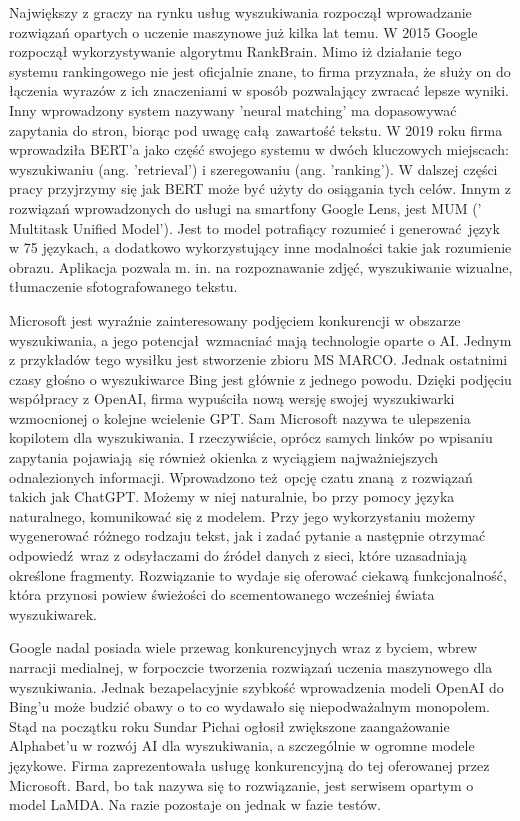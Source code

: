 Największy z graczy na rynku usług wyszukiwania rozpoczął wprowadzanie rozwiązań opartych o uczenie maszynowe już kilka lat temu. W 2015 Google rozpoczął wykorzystywanie algorytmu RankBrain. Mimo iż działanie tego systemu rankingowego nie jest oficjalnie znane, to firma przyznała, że służy on do łączenia wyrazów z ich znaczeniami w sposób pozwalający zwracać lepsze wyniki. Inny wprowadzony system nazywany 'neural matching' ma dopasowywać zapytania do stron, biorąc pod uwagę całą zawartość tekstu. W 2019 roku firma wprowadziła BERT'a jako część swojego systemu w dwóch kluczowych miejscach: wyszukiwaniu (ang. 'retrieval') i szeregowaniu (ang. 'ranking'). W dalszej części pracy przyjrzymy się jak BERT może być użyty do osiągania tych celów. Innym z rozwiązań wprowadzonych do usługi na smartfony Google Lens, jest MUM (' Multitask Unified Model'). Jest to model potrafiący rozumieć i generować język w 75 językach, a dodatkowo wykorzystujący inne modalności takie jak rozumienie obrazu. \autocite{howaipowers} Aplikacja pozwala m. in. na rozpoznawanie zdjęć, wyszukiwanie wizualne, tłumaczenie sfotografowanego tekstu.\newline

Microsoft jest wyraźnie zainteresowany podjęciem konkurencji w obszarze wyszukiwania, a jego potencjał wzmacniać mają technologie oparte o AI. Jednym z przykładów tego wysiłku jest stworzenie zbioru MS MARCO. Jednak ostatnimi czasy głośno o wyszukiwarce Bing jest głównie z jednego powodu. Dzięki podjęciu współpracy z OpenAI, firma wypuściła nową wersję swojej wyszukiwarki wzmocnionej o kolejne wcielenie GPT. Sam Microsoft nazywa te ulepszenia kopilotem dla wyszukiwania. I rzeczywiście, oprócz samych linków po wpisaniu zapytania pojawiają się również okienka z wyciągiem najważniejszych odnalezionych informacji. Wprowadzono też opcję czatu znaną z rozwiązań takich jak ChatGPT. Możemy w niej naturalnie, bo przy pomocy języka naturalnego, komunikować się z modelem. Przy jego wykorzystaniu możemy wygenerować różnego rodzaju tekst, jak i zadać pytanie a następnie otrzymać odpowiedź wraz z odsyłaczami do źródeł danych z sieci, które uzasadniają określone fragmenty. \autocite{reinventingsearch} Rozwiązanie to wydaje się oferować ciekawą funkcjonalność, która przynosi powiew świeżości do scementowanego wcześniej świata wyszukiwarek. \newline  

Google nadal posiada wiele przewag konkurencyjnych wraz z byciem, wbrew narracji medialnej, w forpoczcie tworzenia rozwiązań uczenia maszynowego dla wyszukiwania. Jednak bezapelacyjnie szybkość wprowadzenia modeli OpenAI do Bing'u może budzić obawy o to co wydawało się niepodważalnym monopolem. Stąd na początku roku Sundar Pichai ogłosił zwiększone zaangażowanie Alphabet'u w rozwój AI dla wyszukiwania, a szczególnie w ogromne modele językowe. Firma zaprezentowała usługę konkurencyjną do tej oferowanej przez Microsoft. Bard, bo tak nazywa się to rozwiązanie, jest serwisem opartym o model LaMDA. Na razie pozostaje on jednak w fazie testów. \autocite{importantnextstep}

